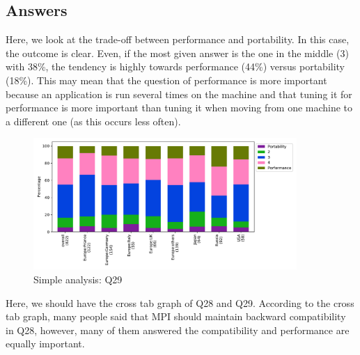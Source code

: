 
\subsection{Answers}


Here, we look at the trade-off between performance and portability. In this case,
the outcome is clear. Even, if the most given answer is the one in the middle (3)
with 38\%, the tendency is highly towards performance (44\%) versus portability
(18\%). This may mean that the question of performance is more important because an
application is run several times on the machine and that tuning it for performance
is more important than tuning it when moving from one machine to a different one
(as this occurs less often).  

\begin{figure}[htb]
\begin{center}
\includegraphics[width=10cm]{../pdfs/Q29.pdf}
\caption{Simple analysis: Q29}
\label{fig:Q29}
\end{center}
\end{figure}

Here, we should have the cross tab graph of Q28 and Q29. According to
the cross tab graph, many people said that MPI should maintain
backward compatibility in Q28, however, many of them answered the
compatibility and performance are equally important.
